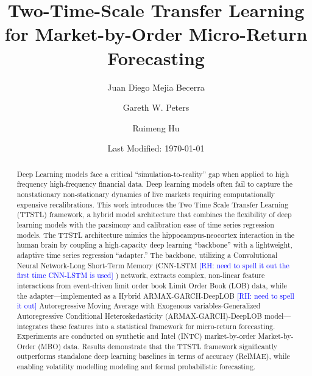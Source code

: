 \documentclass[10pt,a4paper,oneside]{article}
\title{Two-Time-Scale Transfer Learning for Market-by-Order Micro-Return Forecasting}
\author[1]{Juan Diego Mejia Becerra}
\author[1]{Gareth W. Peters}
\author[1,2]{Ruimeng Hu}
\affil[1]{Department of Statistics and Applied Probability, University of California, Santa Barbara}
\affil[2]{Department of Mathematics, University of California, Santa Barbara}
\date{Last Modified: \today}
\newcommand{\rh}[1]{\textcolor{blue}{\textsf{[RH: #1]}}}
\providecommand{\DIFaddtex}[1]{{\protect\color{blue} \sf #1}} %
\providecommand{\DIFdeltex}[1]{{\protect\color{red} \scriptsize #1}} %
\providecommand{\DIFaddbegin}{} %
\providecommand{\DIFaddend}{} %
\providecommand{\DIFdelbegin}{} %
\providecommand{\DIFdelend}{} %
\providecommand{\DIFadd}[1]{\texorpdfstring{\DIFaddtex{#1}}{#1}} %
\providecommand{\DIFdel}[1]{\texorpdfstring{\DIFdeltex{#1}}{}} %
\newcommand{\DIFscaledelfig}{0.5}
\newlength{\DIFdelgraphicswidth} %
\newlength{\DIFdelgraphicsheight} %
\newcommand{\DIFaddincludegraphics}[2][]{{\color{blue}\fbox{\DIFOincludegraphics[#1]{#2}}}} %
\newcommand{\DIFdelincludegraphics}[2][]{%
\sbox{\DIFdelgraphicsbox}{\DIFOincludegraphics[#1]{#2}}%
\settoboxwidth{\DIFdelgraphicswidth}{\DIFdelgraphicsbox} %
\settoboxtotalheight{\DIFdelgraphicsheight}{\DIFdelgraphicsbox} %
\scalebox{\DIFscaledelfig}{%
\parbox[b]{\DIFdelgraphicswidth}{\usebox{\DIFdelgraphicsbox}\\[-\baselineskip] \rule{\DIFdelgraphicswidth}{0em}}\llap{\resizebox{\DIFdelgraphicswidth}{\DIFdelgraphicsheight}{%
\setlength{\unitlength}{\DIFdelgraphicswidth}%
\begin{picture}(1,1)%
\thicklines\linethickness{2pt} %
{\color[rgb]{1,0,0}\put(0,0){\framebox(1,1){}}}%
{\color[rgb]{1,0,0}\put(0,0){\line( 1,1){1}}}%
{\color[rgb]{1,0,0}\put(0,1){\line(1,-1){1}}}%
\end{picture}%
}\hspace*{3pt}}} %
} %
\DeclareRobustCommand{\DIFaddbegin}{\DIFOaddbegin \let\includegraphics\DIFaddincludegraphics} %
\DeclareRobustCommand{\DIFaddend}{\DIFOaddend \let\includegraphics\DIFOincludegraphics} %
\DeclareRobustCommand{\DIFdelbegin}{\DIFOdelbegin \let\includegraphics\DIFdelincludegraphics} %
\DeclareRobustCommand{\DIFdelend}{\DIFOaddend \let\includegraphics\DIFOincludegraphics} %
\begin{document}
\maketitle
\linenumbers

\begin{abstract}
    Deep Learning models face a critical ``simulation-to-reality'' gap when applied to \DIFdelbegin \DIFdel{high frequency }\DIFdelend \DIFaddbegin \DIFadd{high-frequency }\DIFaddend financial data. Deep learning models often fail to capture the \DIFdelbegin \DIFdel{nonstationary }\DIFdelend \DIFaddbegin \DIFadd{non-stationary }\DIFaddend dynamics of live markets requiring computationally expensive recalibrations. This work introduces the Two Time Scale Transfer Learning (TTSTL) framework, a hybrid model architecture that combines the flexibility of deep learning models with the parsimony and calibration ease of time series regression models. The TTSTL architecture mimics the hippocampus-neocortex interaction in the human brain by coupling a high-capacity deep learning ``backbone'' with a lightweight, adaptive time series regression ``adapter.'' The backbone, utilizing a \DIFaddbegin \DIFadd{Convolutional Neural Network-Long Short-Term Memory (}\DIFaddend CNN-LSTM\DIFdelbegin \DIFdel{\rh{need to spell it out the first time CNN-LSTM is used} }\DIFdelend \DIFaddbegin \DIFadd{) }\DIFaddend network, extracts complex, non-linear feature interactions from event-driven \DIFdelbegin \DIFdel{limit order book }\DIFdelend \DIFaddbegin \DIFadd{Limit Order Book (LOB) }\DIFaddend data, while the adapter—implemented as a Hybrid \DIFdelbegin \DIFdel{ARMAX-GARCH-DeepLOB \rh{need to spell it out} }\DIFdelend \DIFaddbegin \DIFadd{Autoregressive Moving Average with Exogenous variables-Generalized Autoregressive Conditional Heteroskedasticity (ARMAX-GARCH)-DeepLOB }\DIFaddend model—integrates these features into a statistical framework for micro-return forecasting. Experiments are conducted on synthetic and Intel (INTC) \DIFdelbegin \DIFdel{market-by-order }\DIFdelend \DIFaddbegin \DIFadd{Market-by-Order (MBO) }\DIFaddend data. Results demonstrate that the TTSTL framework significantly outperforms standalone deep learning baselines in terms of accuracy (RelMAE), while enabling volatility \DIFdelbegin \DIFdel{modelling }\DIFdelend \DIFaddbegin \DIFadd{modeling }\DIFaddend and formal probabilistic forecasting.
\end{abstract}

\end{document}
